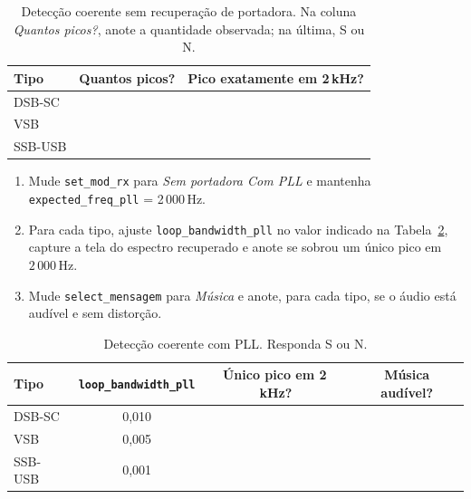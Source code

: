 \documentclass[11pt,a4paper]{article}
\begin{document}
\begin{table}[H]
      \centering
      \begin{tabular}{l c c}
            \toprule
            \textbf{Tipo} & \textbf{Quantos picos?} & \textbf{Pico exatamente em 2\,kHz?} \\
            \midrule
            DSB-SC        &                         &                                     \\
            VSB           &                         &                                     \\
            SSB-USB       &                         &                                     \\
            \bottomrule
      \end{tabular}
      \caption{Detecção coerente sem recuperação de portadora. Na coluna
            \emph{Quantos picos?}, anote a quantidade observada; na última, S ou N.}
      \label{tab:sempll}
\end{table}

\begin{instrucao}
      \begin{enumerate}[label=\arabic*.]
            \item Mude \texttt{set\_mod\_rx} para \emph{Sem portadora Com PLL} e mantenha
                  \texttt{expected\_freq\_pll} = 2\,000\,Hz.
            \item Para cada tipo, ajuste \texttt{loop\_bandwidth\_pll} no valor
                  indicado na Tabela~\ref{tab:pll}, capture a tela do espectro
                  recuperado e anote se sobrou um único pico em $2\,000$\,Hz.
            \item Mude \texttt{select\_mensagem} para \emph{Música} e anote, para
                  cada tipo, se o áudio está audível e sem distorção.
      \end{enumerate}
\end{instrucao}

\begin{table}[H]
      \centering
      \begin{tabular}{l c c c}
            \toprule
            \textbf{Tipo} & \texttt{loop\_bandwidth\_pll} & \textbf{Único pico em 2\,kHz?} & \textbf{Música audível?} \\
            \midrule
            DSB-SC        & 0,010                         &                                &                          \\
            VSB           & 0,005                         &                                &                          \\
            SSB-USB       & 0,001                         &                                &                          \\
            \bottomrule
      \end{tabular}
      \caption{Detecção coerente com PLL. Responda S ou N.}
      \label{tab:pll}
\end{table}
\end{document}
